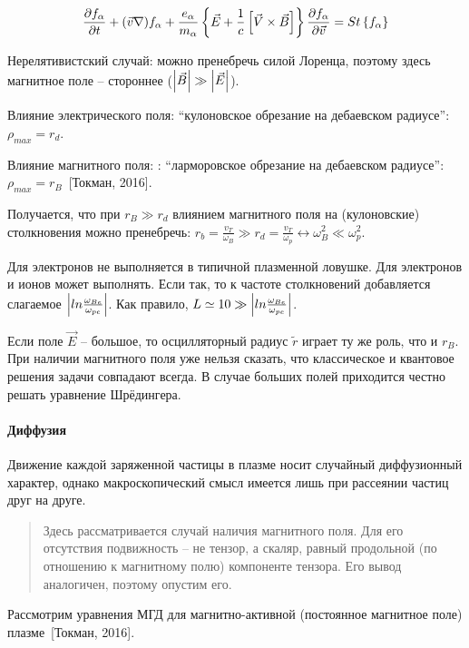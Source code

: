 \documentclass[10pt, a4paper]{article}
\newcommand{\Tokman}{~[Токман, 2016]}
\begin{document}
\begin{equation*}
	\pdv{f_\alpha}{t} + (\vec{v}\nabla)f_\alpha + \frac{e_\alpha}{m_\alpha}\left\{\vec{E}+\frac{1}{c}\left[\vec{V}\times\vec{B}\right]\right\}\pdv{f_\alpha}{\vec{v}} = St\left\{f_\alpha\right\}
\end{equation*}

Нерелятивистский случай: можно пренебречь силой Лоренца, поэтому здесь магнитное поле -- стороннее ($\abs{\vec{B}} \gg \abs{\vec{E}}$).

Влияние электрического поля: ``кулоновское обрезание на дебаевском радиусе'': $\rho_{max} = r_d$. 

Влияние магнитного поля: : ``ларморовское обрезание на дебаевском радиусе'':
$\rho_{max} = r_B$\Tokman. 

Получается, что при $r_B \gg r_d$ влиянием магнитного поля на (кулоновские) столкновения можно пренебречь: $r_b=\frac{v_T}{\omega_B} \gg r_d=\frac{v_T}{\omega_{p}} \leftrightarrow \omega_B^2 \ll \omega_{p}^2$.

Для электронов не выполняется в типичной плазменной ловушке. Для электронов и ионов может выполнять. Если так, то к частоте столкновений добавляется слагаемое $\abs{ln\frac{\omega_{Be}}{\omega_{pe}}}$. Как правило, $L \simeq 10 \gg \abs{ln\frac{\omega_{Be}}{\omega_{pe}}}$.

Если поле $\vec{E}$ -- большое, то осцилляторный радиус $\tilde{r}$ играет ту же роль, что и $r_B$. При наличии магнитного поля уже нельзя сказать, что классическое и квантовое решения задачи совпадают всегда. В случае больших полей приходится честно решать уравнение Шрёдингера.

\paragraph{Диффузия} \label{par:diffusion}

Движение каждой заряженной частицы в плазме носит случайный диффузионный характер, однако макроскопический смысл имеется лишь при рассеянии частиц друг на друге\cite{arzimovich}.

\begin{quotation}
	Здесь рассматривается случай наличия магнитного поля. Для его отсутствия подвижность -- не тензор, а скаляр, равный продольной (по отношению к магнитному полю) компоненте тензора. Его вывод аналогичен, поэтому опустим его.
\end{quotation}

Рассмотрим уравнения МГД для магнитно-активной (постоянное магнитное поле) плазме\Tokman. 
\end{document}
